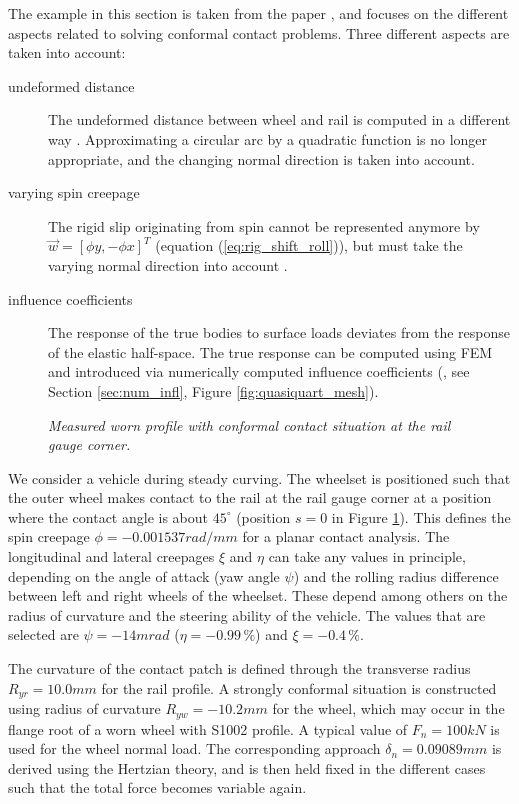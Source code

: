 \documentclass[12pt]{report}
\begin{document}
The example in this section is taken from the paper
\cite{Vollebregt2018b-corrigendum}, and focuses on the different aspects
related to solving conformal contact problems. 
Three different aspects are taken into account:
\begin{description}
\item[undeformed distance] The undeformed distance between wheel and rail
is computed in a different way \cite{Vollebregt2014d-conformal}. 
Approximating a circular arc by a quadratic function is no longer
appropriate, and the changing normal direction is taken into account.
\item[varying spin creepage] The rigid slip originating from spin cannot be
represented anymore by $\vec{w}=[\phi y, -\phi x]^T$ (equation 
(\ref{eq:rig_shift_roll})), but must take the varying normal direction
into account \cite{Li_zili2002-phd-thesis}.
\item[influence coefficients] The response of the true bodies to surface
loads deviates from the response of the elastic half-space. The true
response can be computed using FEM and introduced via numerically computed
influence coefficients (\cite{Vollebregt2014d-conformal}, see Section
\ref{sec:num_infl}, Figure \ref{fig:quasiquart_mesh}).
\end{description}

\begin{figure}[bt]
\centering
{}
\caption{\em Measured worn profile with conformal contact situation
        at the rail gauge corner.}
\label{fig:worn_profile}
\end{figure}

We consider a vehicle during steady curving. The wheelset is positioned
such that the outer wheel makes contact to the rail at the rail gauge
corner at a position where the contact angle is about $45^\circ$ (position
$s=0$ in Figure \ref{fig:worn_profile}). This defines the spin creepage
$\phi=-0.001537\unit{rad/mm}$ for a planar contact analysis. The longitudinal
and lateral creepages $\xi$ and $\eta$ can take any values in principle,
depending on the angle of attack (yaw angle $\psi$) and the rolling radius
difference between left and right wheels of the wheelset. These depend
among others on the radius of curvature and the steering ability of the
vehicle. The values that are selected are $\psi=-14\unit{mrad}$
($\eta=-0.99\,\%$) and $\xi=-0.4\,\%$.

The curvature of the contact patch is defined through the transverse radius
$R_{yr}=10.0\unit{mm}$ for the rail profile. A strongly conformal situation is
constructed using radius of curvature $R_{yw}=-10.2\unit{mm}$ for the wheel, which
may occur in the flange root of a worn wheel with S1002 profile. A typical
value of $F_n=100\unit{kN}$ is used for the wheel normal load. The corresponding
approach $\delta_n=0.09089\unit{mm}$ is derived using the Hertzian theory, and is
then held fixed in the different cases such that the total force becomes
variable again.
\end{document}
